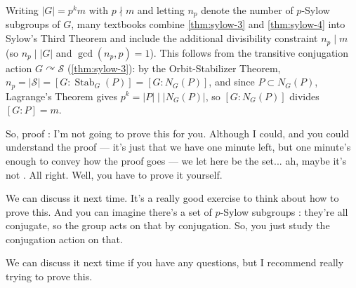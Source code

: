\begin{aiNote}
Writing $|G| = p^k m$ with $p \nmid m$ and letting $n_p$ denote the number of $p$-Sylow subgroups of $G$, many textbooks combine \cref{thm:sylow-3} and \cref{thm:sylow-4} into Sylow's Third Theorem and include the additional divisibility constraint $n_p \mid m$ (so $n_p \mid |G|$ and $\gcd(n_p, p) = 1$). This follows from the transitive conjugation action $G \curvearrowright \mathcal{S}$ (\cref{thm:sylow-3}): by the Orbit-Stabilizer Theorem, $n_p = |\mathcal{S}| = [G : \operatorname{Stab}_G(P)] = [G : N_G(P)]$, and since $P \subset N_G(P)$, Lagrange's Theorem gives $p^k = |P| \mid |N_G(P)|$, so $[G : N_G(P)]$ divides $[G : P] = m$.
\end{aiNote}

\begin{speech}[00:41:47 - 00:42:30]
So, proof : I'm not going to prove this for you. Although I could, and you could understand the proof --- it's just that we have one minute left, but one minute's enough to convey how the proof goes --- we let here be the set... ah, maybe it's not . All right. Well, you have to prove it yourself.

We can discuss it next time. It's a really good exercise to think about how to prove this. And you can imagine there's a set of $p$-Sylow subgroups : they're all conjugate, so the group acts on that by conjugation. So, you just study the conjugation action on that.

We can discuss it next time if you have any questions, but I recommend really trying to prove this.
\end{speech}

